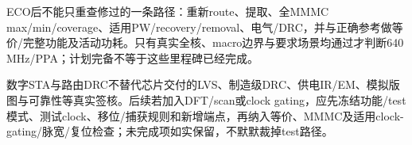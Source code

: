 ECO后不能只重查修过的一条路径：重新route、提取、全MMMC max/min/coverage、适用PW/recovery/removal、电气/DRC，并与正确参考做等价/完整功能及活动功耗。只有真实全核、macro边界与要求场景均通过才判断640\,MHz/PPA；计划完备不等于这些里程碑已经完成。

数字STA与路由DRC不替代芯片交付的LVS、制造级DRC、供电IR/EM、模拟版图与可靠性等真实签核。后续若加入DFT/scan或clock gating，应先冻结功能/test模式、测试clock、移位/捕获规则和新增端点，再纳入等价、MMMC及适用clock-gating/脉宽/复位检查；未完成项如实保留，不默默裁掉test路径。
